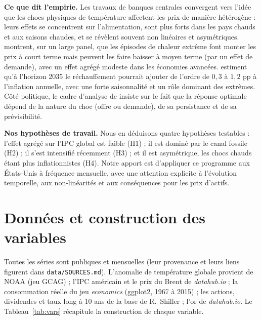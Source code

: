 \documentclass[11pt,a4paper]{article}
\begin{document}
\textbf{Ce que dit l'empirie.} Les travaux de banques centrales convergent vers l'idée que
les chocs physiques de température affectent les prix de manière hétérogène : leurs effets se
concentrent sur l'alimentation, sont plus forts dans les pays chauds et aux saisons chaudes,
et se révèlent souvent non linéaires et asymétriques. \citet{faccia2021} montrent, sur un
large panel, que les épisodes de chaleur extrême font monter les prix à court terme mais
peuvent les faire baisser à moyen terme (par un effet de demande), avec un effet agrégé
modeste dans les économies avancées. \citet{kotz2024} estiment qu'à l'horizon 2035 le
réchauffement pourrait ajouter de l'ordre de $0{,}3$ à $1{,}2$ pp à l'inflation annuelle,
avec une forte saisonnalité et un rôle dominant des extrêmes. Côté politique, le cadre
d'analyse de \citet{batten2020} insiste sur le fait que la réponse optimale dépend de la
nature du choc (offre ou demande), de sa persistance et de sa prévisibilité.

\textbf{Nos hypothèses de travail.} Nous en déduisons quatre hypothèses testables :
l'effet agrégé sur l'IPC global est faible (H1) ; il est dominé par le canal fossile (H2) ;
il s'est intensifié récemment (H3) ; et il est asymétrique, les chocs chauds étant plus
inflationnistes (H4). Notre apport est d'appliquer ce programme aux États-Unis à fréquence
mensuelle, avec une attention explicite à l'évolution temporelle, aux
non-linéarités et aux conséquences pour les prix d'actifs.

\section{Données et construction des variables}
\label{sec:data}
Toutes les séries sont publiques et mensuelles (leur provenance et leurs liens figurent dans
\texttt{data/SOURCES.md}). L'anomalie de température
globale provient de NOAA (jeu GCAG) ; l'IPC américain et le prix du Brent de
\emph{datahub.io} ; la consommation réelle du jeu \emph{economics} (ggplot2, 1967 à 2015) ;
les actions, dividendes et taux long à 10 ans de la base de R.~Shiller ; l'or de
\emph{datahub.io}. Le Tableau~\ref{tab:vars} récapitule la construction de chaque variable.
\end{document}
